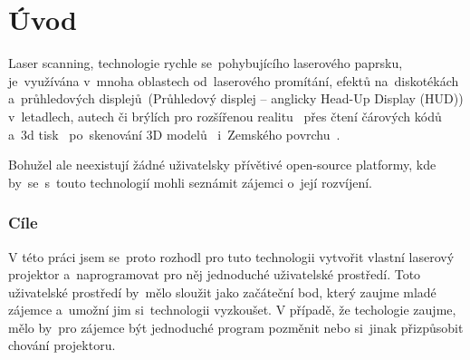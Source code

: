 \chapter*{Úvod}


Laser scanning, technologie rychle se~pohybujícího laserového paprsku, je~využívána v~mnoha oblastech od~laserového promítání, efektů na~diskotékách a~průhledových displejů~(Průhledový displej -- anglicky Head-Up Display (HUD)) v~letadlech, autech či brýlích pro rozšířenou realitu~\cite{laser-huds} přes čtení čárových kódů~\cite{history-of-barcode-scanning} a~3d tisk~\cite{Photo-curing-3D-printing} po~skenování 3D modelů~\cite{3d-model-scan} i~Zemského povrchu~\cite{heightmaps}.

Bohužel ale neexistují žádné uživatelsky přívětivé open-source platformy, kde by~se~s~touto technologií mohli seznámit zájemci o~její rozvíjení.

\subsection*{Cíle}
V této práci jsem se~proto rozhodl pro tuto technologii vytvořit vlastní laserový projektor a~naprogramovat pro něj jednoduché uživatelské prostředí.
Toto uživatelské prostředí by~mělo sloužit jako začáteční bod, který zaujme mladé zájemce a~umožní jim si~technologii vyzkoušet.
V případě, že techologie zaujme, mělo by~pro zájemce být jednoduché program pozměnit nebo si~jinak přizpůsobit chování projektoru.
